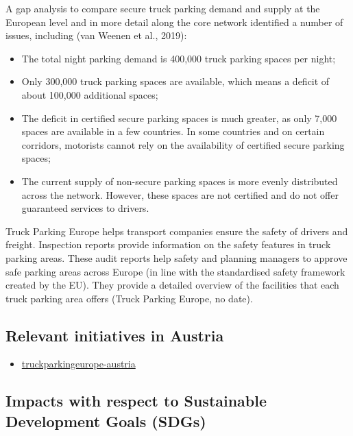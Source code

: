 \documentclass[
]{book}
\providecommand{\tightlist}{%
  \setlength{\itemsep}{0pt}\setlength{\parskip}{0pt}}
\begin{document}
A gap analysis to compare secure truck parking demand and supply at the European level and in more detail along the core network identified a number of issues, including (van Weenen et al., 2019):

\begin{itemize}
\tightlist
\item
  The total night parking demand is 400,000 truck parking spaces per night;
\item
  Only 300,000 truck parking spaces are available, which means a deficit of about 100,000 additional spaces;
\item
  The deficit in certified secure parking spaces is much greater, as only 7,000 spaces are available in a few countries. In some countries and on certain corridors, motorists cannot rely on the availability of certified secure parking spaces;
\item
  The current supply of non-secure parking spaces is more evenly distributed across the network. However, these spaces are not certified and do not offer guaranteed services to drivers.
\end{itemize}

Truck Parking Europe helps transport companies ensure the safety of drivers and freight. Inspection reports provide information on the safety features in truck parking areas. These audit reports help safety and planning managers to approve safe parking areas across Europe (in line with the standardised safety framework created by the EU). They provide a detailed overview of the facilities that each truck parking area offers (Truck Parking Europe, no date).

\hypertarget{relevant-initiatives-in-austria-20}{%
\subsection*{Relevant initiatives in Austria}\label{relevant-initiatives-in-austria-20}}

\begin{itemize}
\tightlist
\item
  \href{https://www.truckparkingeurope.com/secure-truck-parking-overview/austria/}{truckparkingeurope-austria}
\end{itemize}

\hypertarget{impacts-with-respect-to-sustainable-development-goals-sdgs-20}{%
\subsection*{Impacts with respect to Sustainable Development Goals (SDGs)}\label{impacts-with-respect-to-sustainable-development-goals-sdgs-20}}
\end{document}

